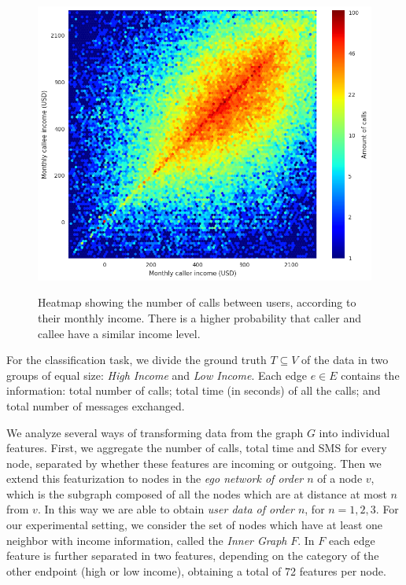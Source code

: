\documentclass[conference]{IEEEtran}
\begin{document}
\begin{figure}[h]
\begin{center}
{\includegraphics[width=\columnwidth]
{figures/Homophily_income_origin_target_usd.png}
}
\caption{Heatmap showing the number of calls between users, according to their monthly income. There is a higher probability that caller and callee have a similar income level.}
\label{homophily_heatmap}
\end{center}
\end{figure}




For the classification task, we divide the ground truth $T \subseteq V$ of the data in two  groups of equal size: \emph{High Income} and \emph{Low Income}.
Each edge $e \in E$ contains the information: total number of calls; total time (in seconds) of all the calls; and total number of messages exchanged.

We analyze several ways of transforming data from the graph $G$ into individual features.
First, we aggregate the number of calls, total time and SMS for every node, separated by whether these features are incoming or outgoing.
Then we extend this featurization to nodes in the \emph{ego network of order $n$} of a node $v$, which is the subgraph composed of all the nodes which are at distance at most $n$ from $v$.
In this way we are able to obtain \emph{user data of order $n$}, for $n = 1, 2, 3$.
For our experimental setting, we consider the set of nodes which have at least one neighbor with income information, called the \emph{Inner Graph} $F$.
In $F$ each edge feature is further separated in two features, depending on the category of the other endpoint (high or low income), obtaining a total of 72 features per node.
\end{document}
